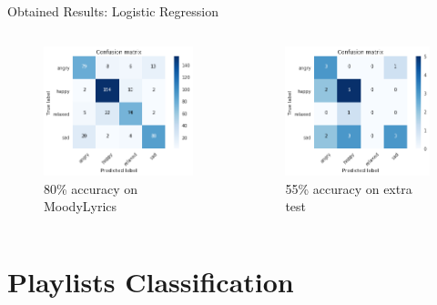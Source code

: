 \documentclass[xcolor=dvipsnames]{beamer}
\begin{document}
\begin{frame}{Obtained Results: Logistic Regression}
\begin{columns}
\begin{figure}
	\includegraphics[scale=0.5,left]{./images/logreg-ml-cm}
	\caption{80\% accuracy on MoodyLyrics}
\end{figure}

\begin{figure}
	\includegraphics[scale=0.5,left]{./images/logreg-extra-cm}
	\caption{55\% accuracy on extra test}
\end{figure}

\end{columns}
\end{frame}

\section{Playlists Classification}
\end{document}
